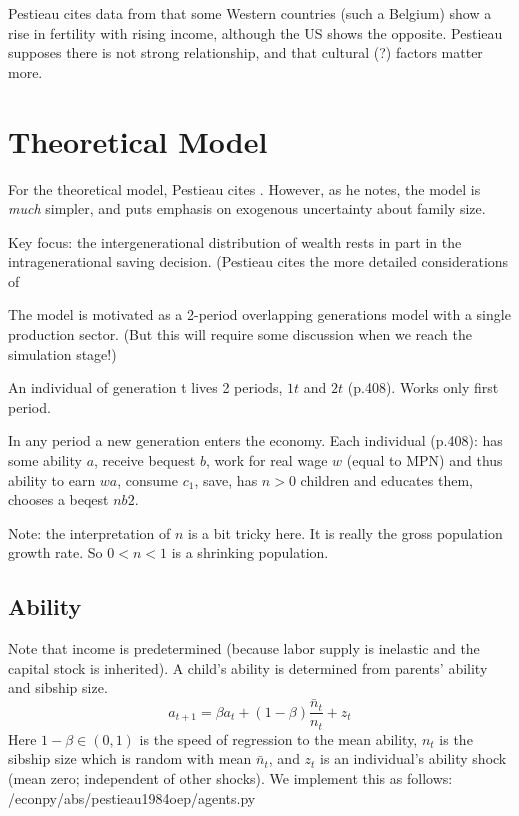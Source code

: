 \documentclass{article}
\begin{document}
Pestieau cites data from \citet{un-1976-fertility} that some Western countries (such a Belgium) show a rise in fertility with rising income, although the US shows the opposite.
Pestieau supposes there is not strong relationship,
and that cultural (?) factors matter more.

\section{Theoretical Model}

For the theoretical model, Pestieau cites \citet{becker-1981-treatise}.
However, as he notes, the model is \emph{much} simpler, and puts emphasis on exogenous uncertainty about family size.

Key focus: the intergenerational distribution of wealth rests in part in the intragenerational saving decision.
(Pestieau cites the more detailed considerations of

The model is motivated as a 2-period overlapping generations model with a single production sector.
(But this will require some discussion when we reach the simulation stage!)

An individual of generation t lives 2 periods, $1t$ and $2t$ (p.408).
Works only first period.

In any period a new generation enters the economy.
Each individual (p.408):
has some ability $a$,
receive bequest $b$,
work for real wage $w$ (equal to MPN) and thus ability to earn $wa$,
consume $c_{1}$,
save,
has $n>0$ children and educates them,
chooses a beqest $n b2$.

Note: the interpretation of $n$ is a bit tricky here.
It is really the gross population growth rate.
So $0<n<1$ is a shrinking population.

\subsection{Ability}

Note that income is predetermined (because labor supply is inelastic and
the capital stock is inherited).
A child's ability is determined from parents' ability and sibship size.
\begin{equation}
a_{t+1} = \beta a_{t} + (1-\beta)\frac{\bar{n}_{t}}{n_{t}} + z_{t}
\label{Pestieau3}\tag{Pestieau 3}
\end{equation}
Here $1-\beta \in (0,1)$ is the speed of regression to the mean ability,
$n_{t}$ is the sibship size which is random with mean $\bar{n}_{t}$,
and $z_{t}$ is an individual's ability shock (mean zero; independent of other shocks).
We implement this as follows:
%
{/econpy/abs/pestieau1984oep/agents.py}
\end{document}
